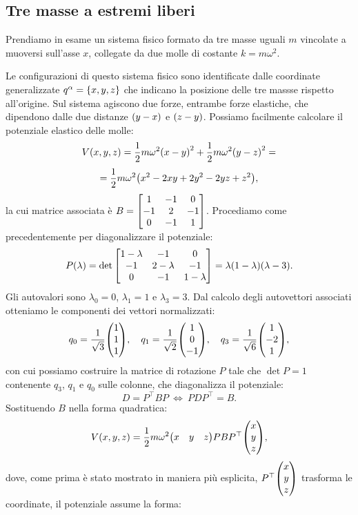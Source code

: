     \subsection{Tre masse a estremi liberi}
        Prendiamo in esame un sistema fisico formato da tre masse uguali $m$ vincolate a muoversi sull'asse $x$, collegate da due molle di costante $k=m\omega^2$.
        \par Le configurazioni di questo sistema fisico sono identificate dalle coordinate generalizzate $q^\alpha=\qty{x,y,z}$ che indicano la posizione delle tre massse rispetto all'origine. Sul sistema agiscono due forze, entrambe forze elastiche, che dipendono dalle due distanze $\qty(y-x)$ e $\qty(z-y)$. Possiamo facilmente calcolare il potenziale elastico delle molle:
            $$V\qty(x,y,z)=\frac{1}{2}m\omega^2\qty(x-y)^2+\frac{1}{2}m\omega^2\qty(y-z)^2=$$
            $$=\frac{1}{2}m\omega^2\qty(x^2-2xy+2y^2-2yz+z^2),$$
        la cui matrice associata \`e $\displaystyle B=\mqty[1 & -1 & 0 \\ -1 & 2 & -1 \\ 0 & -1 & 1]$. Procediamo come precedentemente per diagonalizzare il potenziale:
            $$P\qty(\lambda)=\det\mqty[1-\lambda & -1 & 0 \\ -1 & 2-\lambda & -1 \\ 0 & -1 & 1-\lambda]=\lambda\qty(1-\lambda)\qty(\lambda-3).$$
        Gli autovalori sono $\lambda_0=0$, $\lambda_1=1$ e $\lambda_3=3$. Dal calcolo degli autovettori associati otteniamo le componenti dei vettori normalizzati:
            $$q_0=\frac{1}{\sqrt{3}}\mqty(1 \\ 1 \\ 1),\quad q_1=\frac{1}{\sqrt{2}}\mqty(1 \\ 0 \\ -1),\quad q_3=\frac{1}{\sqrt{6}}\mqty(1 \\ -2 \\ 1),$$
        con cui possiamo costruire la matrice di rotazione $P$ tale che $\det P=1$ contenente $q_3$, $q_1$ e $q_0$ sulle colonne, che diagonalizza il potenziale:
            $$D=P^\top BP\ \iff\ PDP^\top=B.$$
        Sostituendo $B$ nella forma quadratica:
            $$V\qty(x,y,z)=\frac{1}{2}m\omega^2\mqty(x & y & z)PBP^\top\mqty(x\\y\\z),$$
        dove, come prima \`e stato mostrato in maniera pi\`u esplicita, $P^\top\mqty(x\\y\\z)$ trasforma le coordinate, il potenziale assume la forma:
